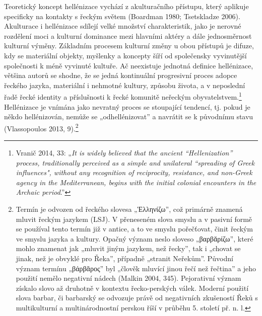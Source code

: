 Teoretický koncept hellénizace vychází z akulturačního přístupu, který aplikuje specificky na kontakty s řeckým světem (Boardman 1980; Tsetskladze 2006). Akulturace i hellénizace sdílejí velké množství charakteristik, jako je nerovné rozdělení moci a kulturní dominance mezi hlavními aktéry a dále jednosměrnost kulturní výměny. Základním procesem kulturní změny u obou přístupů je difuze, kdy se materiální objekty, myšlenky a koncepty šíří od společensky vyvinutější společnosti k méně vyvinuté kultuře. Ač neexistuje jednotná definice hellénizace, většina autorů se shodne, že se jedná kontinuální progresivní proces adopce řeckého jazyka, materiální i nehmotné kultury, způsobu života, a v neposlední řadě řecké identity a příslušnosti k řecké komunitě neřeckým obyvatelstvem.\footnote{Vranič 2014, 33: „{\em It is widely believed that the ancient “Hellenization” process, traditionally perceived as a simple and unilateral “spreading of Greek influences", without any recognition of reciprocity, resistance, and non-Greek agency in the Mediterranean, begins with the initial colonial encounters in the Archaic period}.”} Hellénizace je vnímána jako nevratný proces se stoupající tendencí, tj. pokud je někdo hellénizován, nemůže se „odhellénizovat” a navrátit se k původnímu stavu (Vlassopoulos 2013, 9).\footnote{ Termín je odvozen od řeckého slovesa „Ἑλληνίζω”, což primárně znamená mluvit řeckým jazykem (LSJ). V přeneseném slova smyslu a v pasivní formě se používal tento termín již v antice, a to ve smyslu pořečťovat, činit řeckým ve smyslu jazyka a kultury. Opačný význam neslo sloveso „βαρβᾰρίζω”, které mohlo znamenat jak „mluvit jiným jazykem, než řecky”, tak i „chovat se jinak, než je obvyklé pro Řeka”, případně „stranit Neřekům”. Původní význam termínu „βάρβᾰρος” byl „člověk mluvící jinou řečí než řečtina” a jeho použití nemělo negativní nádech (Malkin 2004, 345). Pejorativní význam získalo slovo až druhotně v kontextu řecko-perských válek. Moderní použití slova barbar, či barbarský se odvozuje právě od negativních zkušeností Řeků s multikulturní a multinárodnostní perskou říší v průběhu 5. století př. n. l.}

